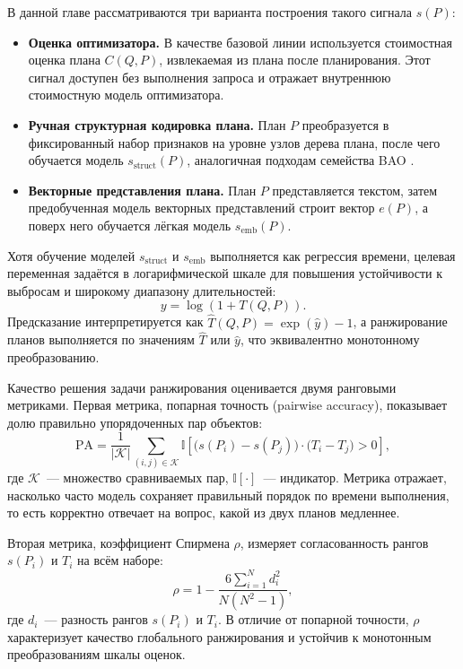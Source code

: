 В данной главе рассматриваются три варианта построения такого сигнала \(s(P)\):
\begin{itemize}
    \item \textbf{Оценка оптимизатора.} В качестве базовой линии используется стоимостная оценка плана \(C(Q,P)\), извлекаемая из плана после планирования. Этот сигнал доступен без выполнения запроса и отражает внутреннюю стоимостную модель оптимизатора.
    \item \textbf{Ручная структурная кодировка плана.} План \(P\) преобразуется в фиксированный набор признаков на уровне узлов дерева плана, после чего обучается модель \(s_{\text{struct}}(P)\), аналогичная подходам семейства BAO \cite{10.1145/3448016.3452838}.
    \item \textbf{Векторные представления плана.} План \(P\) представляется текстом, затем предобученная модель векторных представлений строит вектор \(e(P)\), а поверх него обучается лёгкая модель \(s_{\text{emb}}(P)\).
\end{itemize}

Хотя обучение моделей \(s_{\text{struct}}\) и \(s_{\text{emb}}\) выполняется как регрессия времени, целевая переменная задаётся в логарифмической шкале для повышения устойчивости к выбросам и широкому диапазону длительностей:
\begin{equation}
    y = \log(1 + T(Q,P)).
\end{equation}
Предсказание интерпретируется как \(\widehat{T}(Q,P)=\exp(\widehat{y})-1\), а ранжирование планов выполняется по значениям \(\widehat{T}\) или \(\widehat{y}\), что эквивалентно монотонному преобразованию.

Качество решения задачи ранжирования оценивается двумя ранговыми метриками.
Первая метрика, попарная точность (pairwise accuracy), показывает долю правильно упорядоченных пар объектов:
\begin{equation}
\label{eq:pairwise-acc}
\mathrm{PA} =
\frac{1}{|\mathcal{K}|}
\sum_{(i,j)\in \mathcal{K}}
\mathbb{I}\left[
\bigl(s(P_i)-s(P_j)\bigr)\cdot\bigl(T_i-T_j\bigr) > 0
\right],
\end{equation}
где \(\mathcal{K}\)~--- множество сравниваемых пар, \(\mathbb{I}[\cdot]\)~--- индикатор. Метрика отражает, насколько часто модель сохраняет правильный порядок по времени выполнения, то есть корректно отвечает на вопрос, какой из двух планов медленнее.

Вторая метрика, коэффициент Спирмена \(\rho\), измеряет согласованность рангов \(s(P_i)\) и \(T_i\) на всём наборе:
\begin{equation}
\label{eq:spearman}
\rho = 1 - \frac{6\sum_{i=1}^{N} d_i^2}{N(N^2-1)},
\end{equation}
где \(d_i\)~--- разность рангов \(s(P_i)\) и \(T_i\). В отличие от попарной точности, \(\rho\) характеризует качество глобального ранжирования и устойчив к монотонным преобразованиям шкалы оценок.



